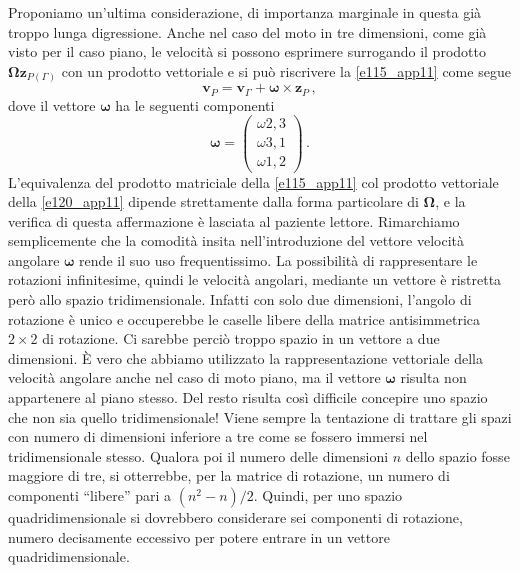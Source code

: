 \noindent Proponiamo un'ultima considerazione, di importanza marginale in questa gi\`a
troppo lunga digressione.
Anche nel caso del moto in tre dimensioni, come gi\`a visto per
il caso piano, le velocit\`a si possono esprimere surrogando
il prodotto 
${\bm \Omega}{\bm z}_{\scriptscriptstyle{P(\Gamma)}}$ con un prodotto
vettoriale e si pu\`o riscrivere la \ref{e115_app11} come segue
\begin{equation}
{\bm v}_{\scriptscriptstyle{P}}=
{\bm v}_{\scriptscriptstyle\Gamma}+
{\bm \omega}\times {\bm z}_{\scriptscriptstyle{P}}\,,
\label{e120_app11}
\end{equation}
\noindent dove il vettore $\bm \omega$ ha le seguenti componenti
\begin{equation}
{\bm\omega}=\left( \begin{array}{c}
\omega{{\scriptscriptstyle{2,3}}}\\
\omega{{\scriptscriptstyle{3,1}}}\\
\omega{{\scriptscriptstyle{1,2}}}
\end{array}
\right)\,.
\label{e119_app11}
\end{equation}
\noindent L'equivalenza del prodotto matriciale della \ref{e115_app11} col prodotto
vettoriale della \ref{e120_app11} dipende strettamente dalla forma particolare
di $\bm \Omega$, e la verifica di questa affermazione \`e lasciata al paziente lettore.
Rimarchiamo semplicemente che la comodit\`a insita nell'introduzione del vettore
velocit\`a angolare $\bm \omega$ rende il suo uso frequentissimo. 
La possibilit\`a di rappresentare le rotazioni infinitesime, quindi 
le velocit\`a angolari, mediante un vettore \`e ristretta per\`o allo spazio tridimensionale.
Infatti con solo due dimensioni, l'angolo di rotazione \`e unico e occuperebbe
le caselle libere della matrice antisimmetrica $2\times2$
di rotazione.
Ci sarebbe perci\`o troppo spazio in un vettore a due dimensioni. \`E vero che 
abbiamo utilizzato la rappresentazione vettoriale della velocit\`a angolare
anche nel caso di moto piano, ma il vettore $\bm \omega$ risulta non appartenere al piano stesso.
Del resto
risulta cos\`i difficile concepire uno spazio che non sia quello tridimensionale!
Viene sempre la tentazione di trattare gli spazi con numero di dimensioni inferiore
a tre come se fossero immersi nel tridimensionale stesso.
Qualora poi il numero delle dimensioni $n$ dello spazio fosse maggiore
di tre,
si otterrebbe, per la matrice di 
rotazione, un numero di componenti ``libere'' pari a $(n^2 - n)/2$.
Quindi, per uno spazio quadridimensionale si dovrebbero considerare sei componenti di rotazione,
numero decisamente eccessivo per potere
entrare in un vettore quadridimensionale.
\endinput
